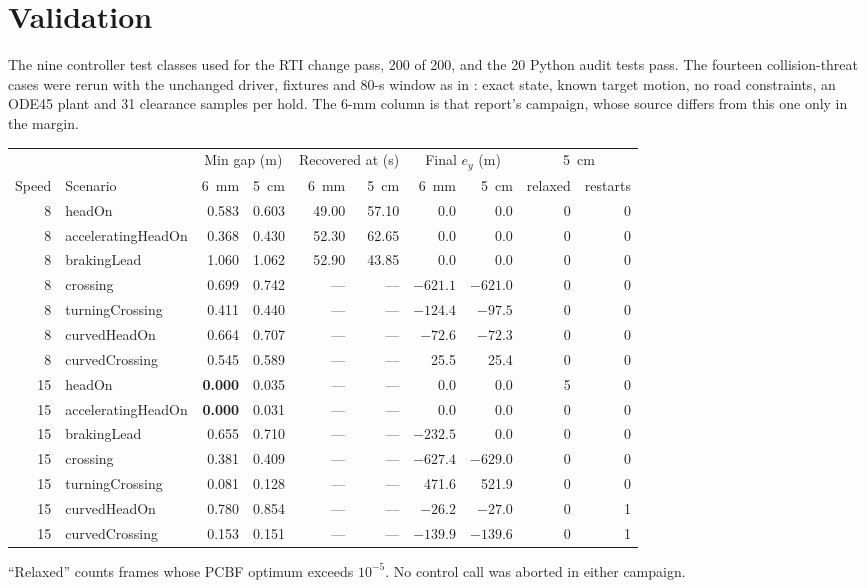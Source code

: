 \documentclass[11pt]{article}
\begin{document}
\section{Validation}
The nine controller test classes used for the RTI change pass, 200 of 200,
and the 20 Python audit tests pass. The fourteen collision-threat cases were
rerun with the unchanged driver, fixtures and 80-s window as in
: exact state, known target motion,
no road constraints, an ODE45 plant and 31 clearance samples per hold. The
6-mm column is that report's campaign, whose source differs from this one only
in the margin.
\begin{center}\footnotesize
\begin{tabular}{rlrrrrrrrr}
\toprule
 & & \multicolumn{2}{c}{Min gap (m)} & \multicolumn{2}{c}{Recovered at (s)} & \multicolumn{2}{c}{Final $e_y$ (m)} & \multicolumn{2}{c}{5~cm}\\
Speed & Scenario & 6~mm & 5~cm & 6~mm & 5~cm & 6~mm & 5~cm & relaxed & restarts\\
\midrule
8 & headOn & 0.583 & 0.603 & 49.00 & 57.10 & 0.0 & 0.0 & 0 & 0\\
8 & acceleratingHeadOn & 0.368 & 0.430 & 52.30 & 62.65 & 0.0 & 0.0 & 0 & 0\\
8 & brakingLead & 1.060 & 1.062 & 52.90 & 43.85 & 0.0 & 0.0 & 0 & 0\\
8 & crossing & 0.699 & 0.742 & --- & --- & $-621.1$ & $-621.0$ & 0 & 0\\
8 & turningCrossing & 0.411 & 0.440 & --- & --- & $-124.4$ & $-97.5$ & 0 & 0\\
8 & curvedHeadOn & 0.664 & 0.707 & --- & --- & $-72.6$ & $-72.3$ & 0 & 0\\
8 & curvedCrossing & 0.545 & 0.589 & --- & --- & 25.5 & 25.4 & 0 & 0\\
15 & headOn & \textbf{0.000} & 0.035 & --- & --- & 0.0 & 0.0 & 5 & 0\\
15 & acceleratingHeadOn & \textbf{0.000} & 0.031 & --- & --- & 0.0 & 0.0 & 0 & 0\\
15 & brakingLead & 0.655 & 0.710 & --- & --- & $-232.5$ & 0.0 & 0 & 0\\
15 & crossing & 0.381 & 0.409 & --- & --- & $-627.4$ & $-629.0$ & 0 & 0\\
15 & turningCrossing & 0.081 & 0.128 & --- & --- & 471.6 & 521.9 & 0 & 0\\
15 & curvedHeadOn & 0.780 & 0.854 & --- & --- & $-26.2$ & $-27.0$ & 0 & 1\\
15 & curvedCrossing & 0.153 & 0.151 & --- & --- & $-139.9$ & $-139.6$ & 0 & 1\\
\bottomrule
\end{tabular}\end{center}
``Relaxed'' counts frames whose PCBF optimum exceeds $10^{-5}$. No control
call was aborted in either campaign.
\end{document}
